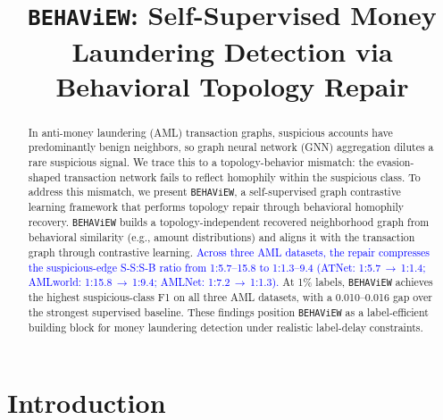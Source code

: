 \documentclass[sigconf,natbib=true,anonymous=true]{acmart}
\theoremstyle{definition}
\newcommand{\method}{\texttt{BEHAViEW}\xspace}
\newcommand{\hofinet}{ATNet\xspace} %
\newcommand{\BLUE}[1]{\textcolor{blue}{#1}}
\begin{document}
\title{\method: Self-Supervised Money Laundering Detection via Behavioral Topology Repair}


\renewcommand{\shortauthors}{\method}


\begin{abstract}
In anti-money laundering (AML) transaction graphs, suspicious accounts have predominantly benign neighbors, so graph neural network (GNN) aggregation dilutes a rare suspicious signal. We trace this to a topology-behavior mismatch: the evasion-shaped transaction network fails to reflect homophily within the suspicious class. To address this mismatch, we present \method, a self-supervised graph contrastive learning framework that performs topology repair through behavioral homophily recovery. \method builds a topology-independent recovered neighborhood graph from behavioral similarity (e.g., amount distributions) and aligns it with the transaction graph through contrastive learning.
\BLUE{Across three AML datasets, the repair compresses the suspicious-edge S-S:S-B ratio from 1:5.7--15.8 to 1:1.3--9.4 (\hofinet: 1:5.7\,$\to$\,1:1.4; AMLworld: 1:15.8\,$\to$\,1:9.4; AMLNet: 1:7.2\,$\to$\,1:1.3).}
At 1\% labels, \method achieves the highest suspicious-class F1 on all three AML datasets, with a 0.010--0.016 gap over the strongest supervised baseline. These findings position \method as a label-efficient building block for money laundering detection under realistic label-delay constraints.
\end{abstract}


\maketitle

\section{Introduction}
\end{document}
